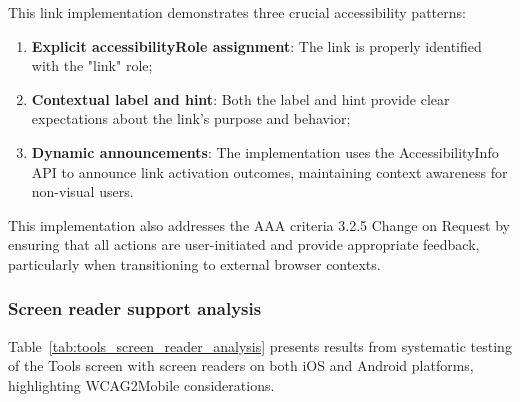 This link implementation demonstrates three crucial accessibility patterns:

\begin{enumerate}
    \item \textbf{Explicit accessibilityRole assignment}: The link is properly identified with the "link" role;
    
    \item \textbf{Contextual label and hint}: Both the label and hint provide clear expectations about the link's purpose and behavior;
    
    \item \textbf{Dynamic announcements}: The implementation uses the AccessibilityInfo API to announce link activation outcomes, maintaining context awareness for non-visual users.
\end{enumerate}

This implementation also addresses the AAA criteria 3.2.5 Change on Request by ensuring that all actions are user-initiated and provide appropriate feedback, particularly when transitioning to external browser contexts.

\subsubsection{Screen reader support analysis}

Table~\ref{tab:tools_screen_reader_analysis} presents results from systematic testing of the Tools screen with screen readers on both iOS and Android platforms, highlighting WCAG2Mobile considerations.

